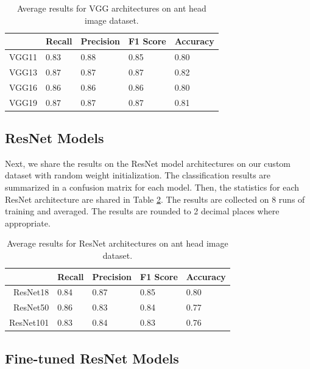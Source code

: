 \documentclass{aci}
\numberwithin{equation}{section}
\begin{document}
\begin{table}[h]
    \centering
    \caption{Average results for VGG architectures on ant head image dataset.}
    \begin{tabular}{r|llll}
              & Recall & Precision & F1 Score & Accuracy \\
        \hline
        VGG11 & 0.83   & 0.88      & 0.85     & 0.80     \\
        VGG13 & 0.87   & 0.87      & 0.87     & 0.82     \\
        VGG16 & 0.86   & 0.86      & 0.86     & 0.80     \\
        VGG19 & 0.87   & 0.87      & 0.87     & 0.81     \\
    \end{tabular}
    \label{tab:vgg_results}
\end{table}

\subsection{ResNet Models}

Next, we share the results on the ResNet model architectures on our custom
dataset with random weight initialization. The classification results are
summarized in a confusion matrix for each model. Then, the statistics for each
ResNet architecture are shared in Table \ref{tab:resnet_results}. The results
are collected on 8 runs of training and averaged. The results are rounded
to 2 decimal places where appropriate.

\begin{table}[h]
    \centering
    \caption{Average results for ResNet architectures on ant head image dataset.}
    \begin{tabular}{r|llll}
                  & Recall & Precision & F1 Score & Accuracy \\
        \hline
        ResNet18  & 0.84   & 0.87      & 0.85     & 0.80     \\
        ResNet50  & 0.86   & 0.83      & 0.84     & 0.77     \\
        ResNet101 & 0.83   & 0.84      & 0.83     & 0.76     \\
    \end{tabular}
    \label{tab:resnet_results}
\end{table}

\clearpage
\subsection{Fine-tuned ResNet Models}
\end{document}
